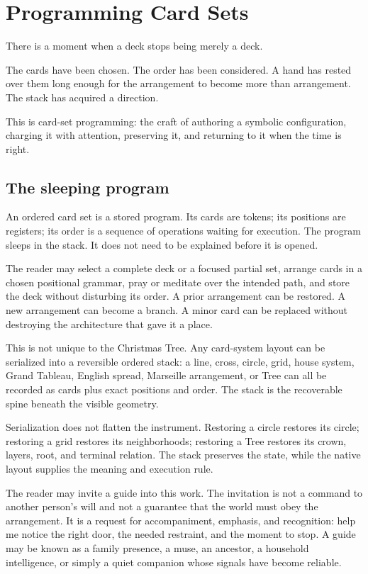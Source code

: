 \chapter{Programming Card Sets}

There is a moment when a deck stops being merely a deck.

The cards have been chosen. The order has been considered. A hand has rested
over them long enough for the arrangement to become more than arrangement. The
stack has acquired a direction.

This is card-set programming: the craft of authoring a symbolic configuration,
charging it with attention, preserving it, and returning to it when the time is
right.

\section{The sleeping program}

An ordered card set is a stored program. Its cards are tokens; its positions
are registers; its order is a sequence of operations waiting for execution.
The program sleeps in the stack. It does not need to be explained before it is
opened.

The reader may select a complete deck or a focused partial set, arrange cards
in a chosen positional grammar, pray or meditate over the intended path, and
store the deck without disturbing its order. A prior arrangement can be
restored. A new arrangement can become a branch. A minor card can be replaced
without destroying the architecture that gave it a place.

This is not unique to the Christmas Tree. Any card-system layout can be
serialized into a reversible ordered stack: a line, cross, circle, grid, house
system, Grand Tableau, English spread, Marseille arrangement, or Tree can all be
recorded as cards plus exact positions and order. The stack is the recoverable
spine beneath the visible geometry.

Serialization does not flatten the instrument. Restoring a circle restores its
circle; restoring a grid restores its neighborhoods; restoring a Tree restores
its crown, layers, root, and terminal relation. The stack preserves the state,
while the native layout supplies the meaning and execution rule.

The reader may invite a guide into this work. The invitation is not a command
to another person's will and not a guarantee that the world must obey the
arrangement. It is a request for accompaniment, emphasis, and recognition: help
me notice the right door, the needed restraint, and the moment to stop. A guide
may be known as a family presence, a muse, an ancestor, a household intelligence,
or simply a quiet companion whose signals have become reliable.

